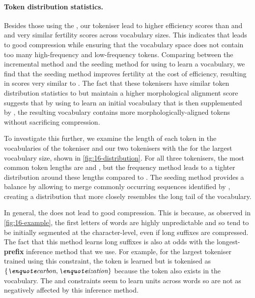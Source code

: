 \paragraph{Token distribution statistics.}

Besides those using the , our \tokname tokeniser lead to higher \renyi efficiency scores than \bpe and \bpewp and very similar fertility scores across vocabulary sizes. This indicates that \tokname leads to good compression while ensuring that the vocabulary space does not contain too many high-frequency and low-frequency tokens. Comparing between the incremental method and the seeding method for using \tokname to learn a vocabulary, we find that the seeding method improves fertility at the cost of \renyi efficiency, resulting in scores very similar to \bpewp. The fact that these tokenisers have similar token distribution statistics to \bpewp but maintain a higher morphological alignment score suggests that by using \tokname to learn an initial vocabulary that is then supplemented by \bpe, the resulting vocabulary contains more morphologically-aligned tokens without sacrificing compression.

To investigate this further, we examine the length of each token in the vocabularies of the \bpewp tokeniser and our two tokenisers with the  for the largest vocabulary size, shown in \cref{fig:16-distribution}. For all three tokenisers, the most common token lengths are  and , but the frequency method leads to a tighter distribution around these lengths compared to \bpewp. The seeding method provides a balance by allowing \bpe to merge commonly occurring sequences identified by \tokname, creating a distribution that more closely resembles the long tail of the \bpewp vocabulary.

In general, the  does not lead to good compression. This is because, as observed in \cref{fig:16-example}, the first letters of words are highly unpredictable and so tend to be initially segmented at the character-level, even if long suffixes are compressed. The fact that this method learns long suffixes is also at odds with the longest-\textbf{prefix} inference method that we use. For example, for the largest tokeniser trained using this constraint, the token  is learned but  is tokenised as \(\{\ex{carbon},\ex{ization}\}\) because the token  also exists in the vocabulary. The  and  constraints seem to learn units across words so are not as negatively affected by this inference method.

